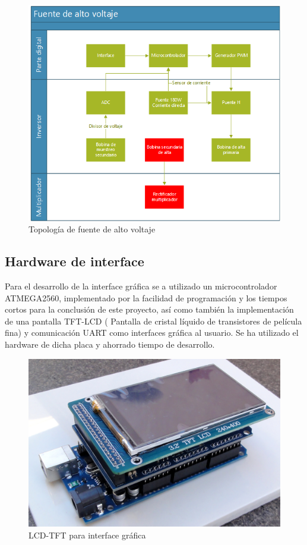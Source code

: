 \begin{figure}[H]
\centering
\includegraphics[width=12
cm]{Capitulo3/figs/diagrama.png}
\caption{Topología de fuente de alto voltaje}
\end{figure}
\newpage
\subsection{Hardware de interface}
Para el desarrollo de la interface gráfica se a utilizado un microcontrolador ATMEGA2560, implementado por la facilidad de programación y los tiempos cortos para la conclusión de este proyecto, así como también la implementación de una pantalla TFT-LCD ( Pantalla de cristal líquido de transistores de película fina) y comunicación UART como interfaces gráfica al usuario. Se ha utilizado el hardware de dicha placa y ahorrado tiempo de desarrollo. \\


\begin{figure}[H]
\centering
\includegraphics[width=9
cm]{Capitulo3/figs/pantalla0.jpg}
\caption{LCD-TFT para interface gráfica}
\end{figure}
\newpage
